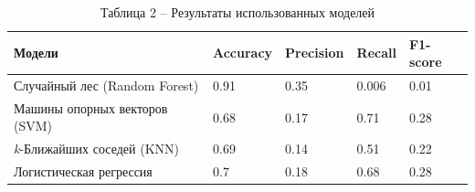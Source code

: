 \begin{table}[H]
	\caption*{Таблица 2 -- Результаты использованных моделей}
	\centering
	\begin{tabular}{|l|l|l|l|l|}
	\hline
	Модели                        & Accuracy & Precision & Recall & F1-score \\ \hline
	Случайный лес (Random Forest) & 0.91     & 0.35      & 0.006  & 0.01     \\ \hline
	Машины опорных векторов (SVM) & 0.68     & 0.17      & 0.71   & 0.28     \\ \hline
	\emph{k}-Ближайших соседей (KNN)      & 0.69     & 0.14      & 0.51   & 0.22     \\ \hline
	Логистическая регрессия       & 0.7      & 0.18      & 0.68   & 0.28     \\ \hline
	\end{tabular}
	\end{table}

